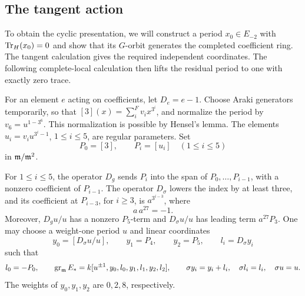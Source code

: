 \subsection{The tangent action}

To obtain the cyclic presentation, we will construct a period
\(x_0\in E_{-2}\) with \(\operatorname{Tr}_H(x_0)=0\) and show that its
\(G\)-orbit generates the completed coefficient ring.  The tangent
calculation gives the required independent coordinates.  The following
complete-local calculation then lifts the residual period to one with
exactly zero trace.

For an element \(e\) acting on coefficients, let \(D_e=e-1\).  Choose
Araki generators temporarily, so that
\([3](x)=\sum_i^F v_i x^{3^i}\), and normalize the period by
\(v_6=u^{1-3^6}\).  This normalization is possible by Hensel's lemma.
The elements \(u_i=v_i u^{3^i-1}\), \(1\le i\le5\), are regular
parameters.  Set
\[
 P_0=[3],\qquad P_i=[u_i]\quad(1\le i\le5)
\]
in \(\mathfrak m/\mathfrak m^2\).

\begin{lemma}\label{coef:tangent}
For \(1\le i\le5\), the operator \(D_g\) sends \(P_i\) into the span of
\(P_0,\ldots,P_{i-1}\), with a nonzero coefficient of \(P_{i-1}\).
The operator \(D_\sigma\) lowers the index by at least three, and its
coefficient at \(P_{i-3}\), for \(i\ge3\), is
\(a^{3^{i-3}}\), where
\[
 a\,a^{27}=-1.
\]
Moreover, \(D_g u/u\) has a nonzero \(P_5\)-term and
\(D_\sigma u/u\) has leading term \(a^{27}P_3\).
One may choose a weight-one period \(u\) and linear coordinates
\[
 y_0=[D_\sigma u/u],\qquad y_1=P_4,\qquad y_2=P_5,\qquad
 l_i=D_\sigma y_i
\]
such that
\[
 l_0=-P_0,\qquad
 \operatorname{gr}_{\mathfrak m}E_*
   =k[u^{\pm1},y_0,l_0,y_1,l_1,y_2,l_2],
 \qquad
 \sigma y_i=y_i+l_i,\quad \sigma l_i=l_i,\quad \sigma u=u.
\]
The weights of \(y_0,y_1,y_2\) are \(0,2,8\), respectively.
\end{lemma}

